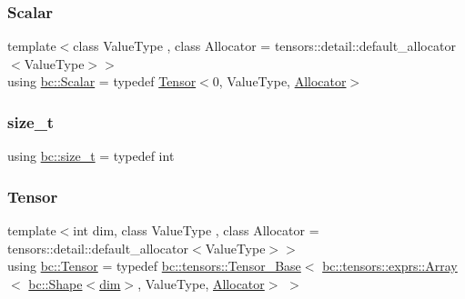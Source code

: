 \mbox{\label{namespacebc_aa12ac55ee2c43dc082894dd3859daee1}} 
\subsubsection{\texorpdfstring{Scalar}{Scalar}}
{\footnotesize\ttfamily template$<$class Value\+Type , class Allocator  = tensors\+::detail\+::default\+\_\+allocator$<$\+Value\+Type$>$$>$ \\
using \hyperlink{namespacebc_aa12ac55ee2c43dc082894dd3859daee1}{bc\+::\+Scalar} = typedef \hyperlink{namespacebc_a659391e47ab612be3ba6c18cf9c89159}{Tensor}$<$0, Value\+Type, \hyperlink{classbc_1_1allocators_1_1Allocator}{Allocator}$>$}

\mbox{\label{namespacebc_aaf8e3fbf99b04b1b57c4f80c6f55d3c5}} 
\subsubsection{\texorpdfstring{size\+\_\+t}{size\_t}}
{\footnotesize\ttfamily using \hyperlink{namespacebc_aaf8e3fbf99b04b1b57c4f80c6f55d3c5}{bc\+::size\+\_\+t} = typedef int}

\mbox{\label{namespacebc_a659391e47ab612be3ba6c18cf9c89159}} 
\subsubsection{\texorpdfstring{Tensor}{Tensor}}
{\footnotesize\ttfamily template$<$int dim, class Value\+Type , class Allocator  = tensors\+::detail\+::default\+\_\+allocator$<$\+Value\+Type$>$$>$ \\
using \hyperlink{namespacebc_a659391e47ab612be3ba6c18cf9c89159}{bc\+::\+Tensor} = typedef \hyperlink{classbc_1_1tensors_1_1Tensor__Base}{bc\+::tensors\+::\+Tensor\+\_\+\+Base}$<$ \hyperlink{structbc_1_1tensors_1_1exprs_1_1Array}{bc\+::tensors\+::exprs\+::\+Array}$<$ \hyperlink{structbc_1_1Shape}{bc\+::\+Shape}$<$\hyperlink{namespacebc_a28c12b5b6f9955c77a8c4b0cf047cfb6}{dim}$>$, Value\+Type, \hyperlink{classbc_1_1allocators_1_1Allocator}{Allocator}$>$ $>$}

\mbox{\label{namespacebc_acb7a07eb9e2d0927fcb611a35d99dc5c}} 
